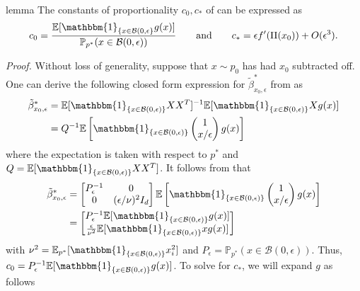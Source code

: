 \documentclass[11pt]{article}
\begin{document}
\begin{restatable}{lemma}{} \label{lemma: constant of prop}
    The constants of proportionality $c_0, c_*$ of  can be expressed as \[c_0 = \frac{\mathbb{E}[\mathbbm{1}_{\{x \in \mathcal{B}(0, \epsilon\}}g(x)]}{\mathbb{P}_{p^*}(x \in \mathcal{B}(0, \epsilon))} \qquad \text{and} \qquad c_* = \epsilon f'(\Pi(x_0))+ O(\epsilon^3).\] 
\end{restatable}
\noindent \textit{Proof.} Without loss of generality, suppose that $x \sim p_0$ has had $x_0$ subtracted off. One can derive the following closed form expression for $\tilde \beta^*_{x_0, \epsilon}$ from  as
\begin{align*}
    \tilde \beta^*_{x_0, \epsilon} &= \mathbb{E}[\mathbbm{1}_{\{x \in \mathcal{B}(0, \epsilon)\}}XX^T]^{-1}\mathbb{E}[\mathbbm{1}_{\{x \in \mathcal{B}(0, \epsilon)\}}Xg(x)] \\
    &= Q^{-1}\mathbb{E}\left[\mathbbm{1}_{\{x \in \mathcal{B}(0, \epsilon)\}}\begin{pmatrix}
        1 \\ x/\epsilon
    \end{pmatrix}g(x)\right]
\end{align*}
where the expectation is taken with respect to $p^*$ and $Q = \mathbb{E}[\mathbbm{1}_{\{x \in \mathcal{B}(0, \epsilon)\}}XX^T]$. It follows from  that
\begin{align*}
    \tilde \beta^*_{x_0, \epsilon} &= \begin{bmatrix}
         P_\epsilon^{-1} & 0 \\
         0 & (\epsilon/\nu)^{2}I_d
    \end{bmatrix}\mathbb{E}\left[\mathbbm{1}_{\{x \in \mathcal{B}(0, \epsilon)\}}\begin{pmatrix}
        1 \\ x/\epsilon
    \end{pmatrix}g(x)\right] \\
    &= \begin{bmatrix}
        P_\epsilon^{-1} \mathbb{E}[\mathbbm{1}_{\{x \in \mathcal{B}(0, \epsilon)\}}g(x)] \\
        \frac{\epsilon}{\nu^2}\mathbb{E}[\mathbbm{1}_{\{x \in \mathcal{B}(0, \epsilon)\}} xg(x)]
    \end{bmatrix}
\end{align*}
with $\nu^2 = \mathbb{E}_{p^*}[\mathbbm{1}_{\{x \in \mathcal{B}(0, \epsilon)\}}x_i^2]$ and $P_{\epsilon} = \mathbb{P}_{p^*}(x \in \mathcal{B}(0, \epsilon)).$ Thus, $c_0 = P_\epsilon^{-1} \mathbb{E}[\mathbbm{1}_{\{x \in \mathcal{B}(0, \epsilon)\}}g(x)]$. To solve for $c_*$, we will expand $g$ as follows
\end{document}
